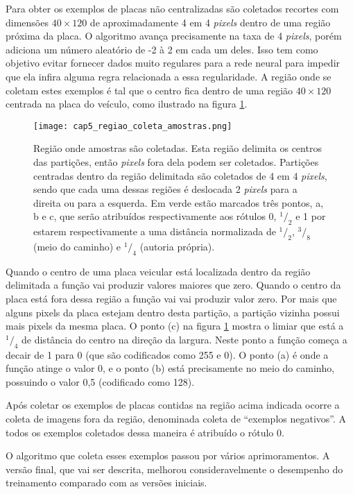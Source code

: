 Para obter os exemplos de placas não centralizadas são coletados recortes
com dimensões $40 \times 120$ de
aproximadamente 4 em 4 \emph{pixels} dentro de uma região próxima da placa. O
algoritmo avança precisamente na taxa de 4 \emph{pixels}, porém adiciona um
número aleatório de -2 à 2 em cada um deles. Isso tem como objetivo evitar
fornecer dados muito regulares para a rede neural para impedir que ela
infira alguma regra relacionada a essa regularidade. A região onde
se coletam estes exemplos é tal que o centro fica dentro de uma região
$40 \times 120$ centrada na placa do veículo, como ilustrado na figura
\ref{fig:cap5_regiao_coleta_amostras}.

\begin{figure}[!htb]
	\centering
	\texttt{[image: cap5\_regiao\_coleta\_amostras.png]}
	\caption[Região onde amostras são coletadas]{
		Região onde amostras são coletadas.
		Esta região delimita os centros das partições, então \emph{pixels} fora
		dela podem ser coletados. Partições centradas dentro da região delimitada
		são coletados de 4 em 4 \emph{pixels}, sendo que cada uma dessas regiões é
		deslocada 2 \emph{pixels} para a direita ou para a esquerda. Em verde estão
		marcados três pontos, a, b e c, que serão atribuídos respectivamente aos
		rótulos 0, $^1/_2$ e 1 por estarem respectivamente a uma distância
		normalizada de $^1/_2$, $^3/_8$ (meio do caminho) e $^1/_4$
		(autoria própria).}
	\label{fig:cap5_regiao_coleta_amostras}
\end{figure}

Quando o centro de uma placa veicular está localizada dentro da região
delimitada a função vai produzir valores maiores que zero. Quando o centro da
placa está fora dessa região a função vai vai produzir valor zero. Por mais que
alguns pixels da placa estejam dentro desta partição, a partição vizinha possui
mais pixels da mesma placa. O ponto
(c) na figura \ref{fig:cap5_regiao_coleta_amostras} mostra o limiar que está
a $^1/_4$ de distância do centro na direção da largura. Neste ponto a função
começa a decair de 1 para 0 (que são codificados como 255 e 0). O ponto (a)
é onde a função atinge o valor 0, e o ponto (b) está precisamente no
meio do caminho, possuindo o valor 0,5 (codificado como 128).

Após coletar os exemplos de placas contidas na região acima indicada ocorre a
coleta de imagens fora da região, denominada coleta de ``exemplos negativos''.
A todos os exemplos coletados dessa maneira é atribuído o rótulo 0.

O algoritmo que coleta esses exemplos passou por vários aprimoramentos. A
versão final, que vai ser descrita, melhorou consideravelmente o desempenho do
treinamento comparado com as versões iniciais.

